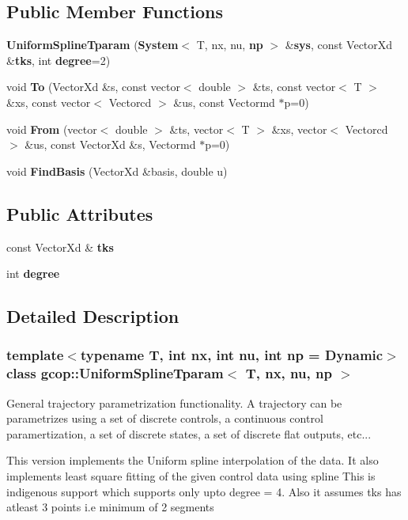 \subsection*{\-Public \-Member \-Functions}
\begin{DoxyCompactItemize}
\item 
{\bf \-Uniform\-Spline\-Tparam} ({\bf \-System}$<$ \-T, nx, nu, {\bf np} $>$ \&{\bf sys}, const \-Vector\-Xd \&{\bf tks}, int {\bf degree}=2)
\item 
void {\bf \-To} (\-Vector\-Xd \&s, const vector$<$ double $>$ \&ts, const vector$<$ \-T $>$ \&xs, const vector$<$ \-Vectorcd $>$ \&us, const \-Vectormd $\ast$p=0)
\item 
void {\bf \-From} (vector$<$ double $>$ \&ts, vector$<$ \-T $>$ \&xs, vector$<$ \-Vectorcd $>$ \&us, const \-Vector\-Xd \&s, \-Vectormd $\ast$p=0)
\item 
void {\bf \-Find\-Basis} (\-Vector\-Xd \&basis, double u)
\end{DoxyCompactItemize}
\subsection*{\-Public \-Attributes}
\begin{DoxyCompactItemize}
\item 
const \-Vector\-Xd \& {\bf tks}
\item 
int {\bf degree}
\end{DoxyCompactItemize}


\subsection{\-Detailed \-Description}
\subsubsection*{template$<$typename T, int nx, int nu, int np = \-Dynamic$>$class gcop\-::\-Uniform\-Spline\-Tparam$<$ T, nx, nu, np $>$}

\-General trajectory parametrization functionality. \-A trajectory can be parametrizes using a set of discrete controls, a continuous control paramertization, a set of discrete states, a set of discrete flat outputs, etc...

\-This version implements the \-Uniform spline interpolation of the data. \-It also implements least square fitting of the given control data using spline \-This is indigenous support which supports only upto degree = 4. \-Also it assumes tks has atleast 3 points i.\-e minimum of 2 segments

